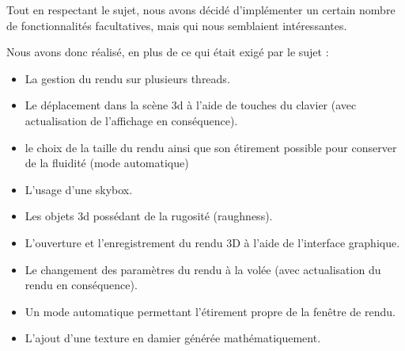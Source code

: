 Tout en respectant le sujet, nous avons décidé d'implémenter un certain nombre de fonctionnalités facultatives, mais qui nous semblaient intéressantes.

Nous avons donc réalisé, en plus de ce qui était exigé par le sujet :
\begin{itemize}
    \item La gestion du rendu sur plusieurs threads.
    \item Le déplacement dans la scène 3d à l'aide de touches du clavier (avec actualisation de l'affichage en conséquence).
    \item le choix de la taille du rendu ainsi que son étirement possible pour conserver de la fluidité (mode automatique)
    \item L'usage d'une skybox.
    \item Les objets 3d possédant de la rugosité (raughness).
    \item L'ouverture et l'enregistrement du rendu 3D à l'aide de l'interface graphique.
    \item Le changement des paramètres du rendu à la volée (avec actualisation du rendu en conséquence).
    \item Un mode automatique permettant l'étirement propre de la fenêtre de rendu.
    \item L'ajout d'une texture en damier générée mathématiquement.
\end{itemize}
